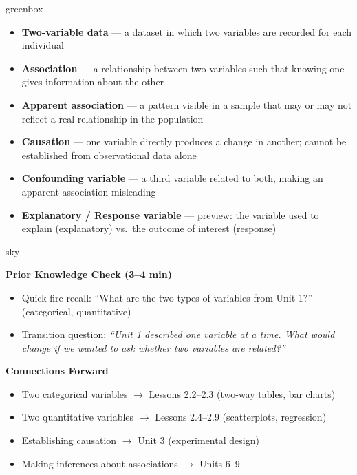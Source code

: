 \documentclass[10pt]{article}
\begin{document}
\begin{skillbox}{greenbox}
\begin{minipage}[t]{0.48\linewidth}
    \begin{itemize}
        \item \textbf{Two-variable data} --- a dataset in which two variables are recorded for each individual
        \item \textbf{Association} --- a relationship between two variables such that knowing one gives information about the other
        \item \textbf{Apparent association} --- a pattern visible in a sample that may or may not reflect a real relationship in the population
    \end{itemize}
\end{minipage}
\hfill
\begin{minipage}[t]{0.48\linewidth}
    \begin{itemize}
        \item \textbf{Causation} --- one variable directly produces a change in another; cannot be established from observational data alone
        \item \textbf{Confounding variable} --- a third variable related to both, making an apparent association misleading
        \item \textbf{Explanatory / Response variable} --- preview: the variable used to explain (explanatory) vs.\ the outcome of interest (response)
    \end{itemize}
\end{minipage}
\end{skillbox}

\begin{skillbox}{sky}
\begin{minipage}[t]{0.48\linewidth}
    \textbf{Prior Knowledge Check (3--4 min)}
    \begin{itemize}
        \item Quick-fire recall: ``What are the two types of variables from Unit 1?''
          (categorical, quantitative)
        \item Transition question: \textit{``Unit 1 described one variable at a time.
          What would change if we wanted to ask whether two variables are related?''}
    \end{itemize}
\end{minipage}
\hfill
\begin{minipage}[t]{0.48\linewidth}
    \textbf{Connections Forward}
    \begin{itemize}
        \item Two categorical variables $\to$ Lessons 2.2--2.3 (two-way tables, bar charts)
        \item Two quantitative variables $\to$ Lessons 2.4--2.9 (scatterplots, regression)
        \item Establishing causation $\to$ Unit 3 (experimental design)
        \item Making inferences about associations $\to$ Units 6--9
    \end{itemize}
\end{minipage}
\end{skillbox}
\end{document}
